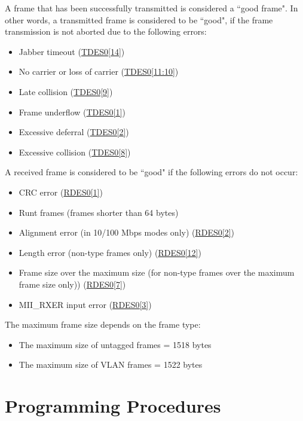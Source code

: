 \documentclass[main\_\_EN.tex]{subfiles}
\begin{document}
A frame that has been successfully transmitted is considered a ``good frame". In other words, a transmitted frame is considered to be ``good", if the frame transmission is not aborted due to the following errors:
\begin{itemize}
\item Jabber timeout (\hyperref[tab:ethernetmac-TDES0]{TDES0[14]})
\item No carrier or loss of carrier (\hyperref[tab:ethernetmac-TDES0]{TDES0[11:10]})
\item Late collision (\hyperref[tab:ethernetmac-TDES0]{TDES0[9]})
\item Frame underflow  (\hyperref[tab:ethernetmac-TDES0]{TDES0[1]})
\item Excessive deferral (\hyperref[tab:ethernetmac-TDES0]{TDES0[2]})
\item Excessive collision (\hyperref[tab:ethernetmac-TDES0]{TDES0[8]})
\end{itemize}
A received frame is considered to be ``good" if the following errors do not occur:
\begin{itemize}
\item CRC error (\hyperref[tab:ethernetmac-RDES0]{RDES0[1]})
\item Runt frames (frames shorter than 64 bytes)
\item Alignment error (in 10/100 Mbps modes only) (\hyperref[tab:ethernetmac-RDES0]{RDES0[2]})
\item Length error (non-type frames only) (\hyperref[tab:ethernetmac-RDES0]{RDES0[12]})
\item Frame size over the maximum size (for non-type frames over the maximum frame size only)) (\hyperref[tab:ethernetmac-RDES0]{RDES0[7]})
\item MII\_RXER input error (\hyperref[tab:ethernetmac-RDES0]{RDES0[3]})
\end{itemize}
The maximum frame size depends on the frame type:
\begin{itemize}
\item The maximum size of untagged frames = 1518 bytes
\item The maximum size of VLAN frames = 1522 bytes
\end{itemize}


\section{Programming Procedures}
\end{document}
